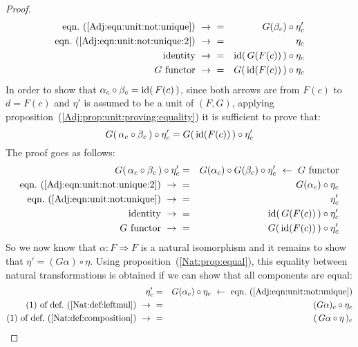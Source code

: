 \begin{proof}
\begin{eqnarray*}
            \mbox{eqn.~(\ref{Adj:eqn:unit:not:unique})}\ \to\ 
            &=&G(\beta_{c})\circ\eta'_{c}\\
            \mbox{eqn.~(\ref{Adj:eqn:unit:not:unique:2})}\ \to\ 
            &=&\eta_{c}\\
            \mbox{identity}\ \to\ 
            &=&\id(\,G(F(c))\,)\circ\eta_{c}\\
            \mbox{$G$ functor}\ \to\ 
            &=&G(\,\id(F(c))\,)\circ\eta_{c}\\
        \end{eqnarray*}
    In order to show that $\alpha_{c}\circ\beta_{c}=\mbox{\rm id}(\,F(c)\,)$, since both 
    arrows are from $F(c)$ to $d=F(c)$ and $\eta'$ is assumed to be a unit of 
    $(F,G)$, applying proposition~(\ref{Adj:prop:unit:proving:equality}) it is 
    sufficient to prove that:
        \[
            G(\,\alpha_{c}\circ\beta_{c}\,)\circ\eta'_{c} 
            = 
            G(\,\mbox{\rm id}(F(c))\,)\circ\eta'_{c}
        \]
    The proof goes as follows:
        \begin{eqnarray*}G(\,\alpha_{c}\circ\beta_{c}\,)\circ\eta'_{c}
            &=&G(\alpha_{c})\circ G(\beta_{c})\circ\eta'_{c}
            \ \leftarrow\ \mbox{$G$ functor}\\
            \mbox{eqn.~(\ref{Adj:eqn:unit:not:unique:2})}\ \to\ 
            &=&G(\alpha_{c})\circ\eta_{c}\\
            \mbox{eqn.~(\ref{Adj:eqn:unit:not:unique})}\ \to\ 
            &=&\eta'_{c}\\
            \mbox{identity}\ \to\ 
            &=&\id(\,G(F(c))\,)\circ\eta'_{c}\\
            \mbox{$G$ functor}\ \to\ 
            &=&G(\,\id(F(c))\,)\circ\eta'_{c}\\
        \end{eqnarray*}
    So we now know that $\alpha:F\Rightarrow F$ is a natural isomorphism and it 
    remains to show that $\eta'=(G\alpha)\circ\eta$. Using 
    proposition~(\ref{Nat:prop:equal}), this equality between natural
    transformations is obtained if we can show that all components are equal:
        \begin{eqnarray*}\eta'_{c}
            &=&G(\alpha_{c})\circ\eta_{c}
            \ \leftarrow\ \mbox{eqn.~(\ref{Adj:eqn:unit:not:unique})}\\
            \mbox{$(1)$ of def.~(\ref{Nat:def:leftmul})}\ \to\ 
            &=&(G\alpha)_{c}\circ\eta_{c}\\
            \mbox{$(1)$ of def.~(\ref{Nat:def:composition})}\ \to\ 
            &=&(\,G\alpha\circ\eta\,)_{c}\\
        \end{eqnarray*}
\end{proof}
